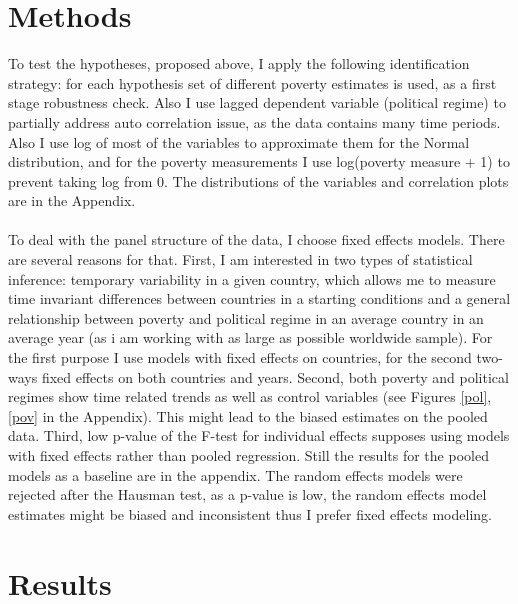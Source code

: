 \documentclass[a4paper, 12pt]{article}
\begin{document}
    \section{Methods}
    
    To test the hypotheses, proposed above, I apply the following identification strategy: for each hypothesis set of different poverty estimates is used, as a first stage robustness check. Also I use lagged dependent variable (political regime) to partially address auto correlation issue, as the data contains many time periods. Also I use log of most of the variables to approximate them for the Normal distribution, and for the poverty measurements I use log(poverty measure + 1) to prevent taking log from 0. The distributions of the variables and correlation plots are in the Appendix.
    \\\\
    To deal with the panel structure of the data, I choose fixed effects models. There are several reasons for that. First, I am interested in two types of statistical inference: temporary variability in a given country, which allows me to measure time invariant differences between countries in a starting conditions and a general relationship between poverty and political regime in an average country in an average year (as i am working with as large as possible worldwide sample). For the first purpose I use models with fixed effects on countries, for the second two-ways fixed effects on both countries and years. Second, both poverty and political regimes show time related trends as well as control variables (see Figures \ref{pol}, \ref{pov} in the Appendix). This might lead to the biased estimates on the pooled data. Third, low p-value of the F-test for individual effects supposes using models with fixed effects rather than pooled regression. Still the results for the pooled models as a baseline are in the appendix. The random effects models were rejected after the Hausman test, as a p-value is low, the random effects model estimates might be biased and inconsistent thus I prefer fixed effects modeling.
    
    \section{Results}
 
\end{document}
